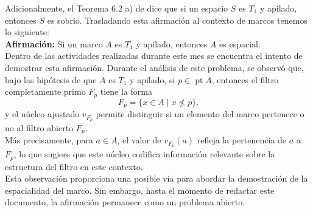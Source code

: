 \documentclass[12pt]{article}
\DeclareMathOperator{\Frm}{Frm}
\DeclareMathOperator{\pt}{pt}
\begin{document}
Adicionalmente, el Teorema 6.2 a) de \cite{sexton2006ordinal} dice que si un espacio $S$ es $T_1$ y apilado, 
entonces $S$ es sobrio. Trasladando esta afirmación al contexto de marcos tenemos lo siguiente:\\

\textbf{Afirmación:} Si un marco $A$ es $T_1$ y apilado, entonces $A$ es espacial.\\

Dentro de las actividades realizadas durante este mes se encuentra el intento de demostrar esta afirmación.
Durante el análisis de este problema, se observó que, bajo las hipótesis de que $A$ es $T_1$
y apilado, si $p\in \pt A$, entonces el filtro completamente primo $F_p$ tiene la forma
\[
F_p=\{x\in A\mid x\nleq p\}.
\] 
y el núcleo ajustado $v_{F_p}$ permite distinguir si un elemento del marco pertenece
o no al filtro abierto $F_p$.\\

Más precisamente, para $a \in A$, el valor de $v_{F_p}(a)$ refleja la pertenencia de $a$ a $F_p$,
lo que sugiere que este núcleo codifica información relevante sobre la estructura del filtro
en este contexto.\\

Esta observación proporciona una posible vía para abordar la demostración de la espacialidad
del marco. Sin embargo, hasta el momento de redactar este documento, la afirmación permanece
como un problema abierto.



\end{document}
